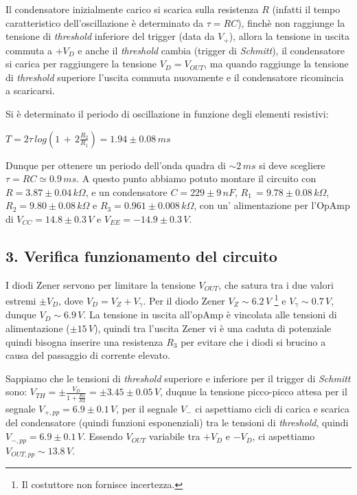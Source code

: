 \documentclass[10pt,a4paper]{article}
\begin{document}
Il condensatore inizialmente carico si scarica sulla resistenza $R$ (infatti il tempo caratteristico dell'oscillazione è determinato da $\tau = RC$), finchè non raggiunge la tensione di \emph{threshold} inferiore del trigger (data da $V_{+}$), allora la tensione in uscita commuta a $+V_{D}$ e anche il \emph{threshold} cambia (trigger di \emph{Schmitt}), il condensatore si carica per raggiungere la tensione $V_D = V_{OUT}$, ma quando raggiunge la tensione di \emph{threshold} superiore l'uscita commuta nuovamente e il condensatore ricomincia a scaricarsi.

Si è determinato il periodo di oscillazione in funzione degli elementi resistivi: 
\begin{center}
$T=2\tau\, log\left( 1\,+\,2\frac{R_2}{R_1}\right) = 1.94 \pm 0.08 \, ms$ 
\end{center}
Dunque per ottenere un periodo dell'onda quadra di $\sim 2 \, ms$ si deve scegliere $\tau = RC\simeq 0.9\,ms$.
A questo punto abbiamo potuto montare il circuito con $R = 3.87 \pm 0.04 \, k\Omega$, e un condensatore $C = 229 \pm 9 \, nF$, $R_1\,= 9.78\pm0.08 \, k\Omega $, $R_2 = 9.80\pm0.08\, k\Omega $ e $R_3 = 0.961\pm0.008 \, k\Omega $, con un' alimentazione per l'OpAmp di $V_{CC} = 14.8 \pm 0.3 \, V$ e $V_{EE} = -14.9 \pm 0.3 \, V$.


\subsection*{3. Verifica funzionamento del circuito}

I diodi Zener servono per limitare la tensione $V_{OUT}$, che satura tra i due valori estremi $\pm V_{D}$, dove $V_{D} = V_{Z} + V_{ \gamma}$. Per il diodo Zener $V_Z \sim 6.2 \, V$ \footnote{Il costuttore non fornisce incertezza.} e $V_{\gamma} \sim 0.7\, V$, dunque $V_D \sim 6.9 \, V$. La tensione in uscita all'opAmp è vincolata alle tensioni di alimentazione ($\pm 15 \, V$), quindi tra l'uscita Zener vi è una caduta di potenziale quindi bisogna inserire una resistenza $R_3$ per evitare che i diodi si brucino a causa del passaggio di corrente elevato.  

Sappiamo che le tensioni di \emph{threshold} superiore e inferiore per il trigger di \emph{Schmitt} sono: $V_{TH} = \pm \frac{V_{D}}{1+\frac{R1}{R2}} = \pm 3.45 \pm 0.05 \, V$, duqnue la tensione picco-picco attesa per il segnale $V_{+, pp} = 6.9 \pm 0.1 \, V$, per il segnale $V_{-}$ ci aspettiamo cicli di carica e scarica del condensatore (quindi funzioni esponenziali) tra le tensioni di \emph{threshold}, quindi $V_{-, pp} = 6.9 \pm 0.1 \, V$. Essendo $V_{OUT}$ variabile tra $+V_{D}$ e $-V_{D}$, ci aspettiamo $V_{OUT, pp} \sim 13.8 \, V$.
\end{document}
